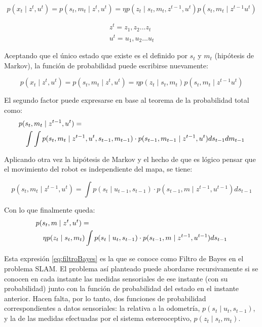 \begin{equation}\label{eq:prob_estado}
    p(x_{t}\mid z^{t},u^{t}) = p(s_{t},m_{t}\mid z^{t},u^{t})=\eta p(z_{t}\mid s_{t},m_{t},z^{t-1},u^{t})p(s_{t},m_{t}\mid z^{t-1}u^{t})
\end{equation}


\begin{eqnarray}
    z^{t} = z_{1},z_{2}...z_{t} \nonumber\\
    u^{t} = u_{1},u_{2}...u_{t}
\end{eqnarray}

Aceptando que el único estado que existe es el definido por $s_{t}$ y $m_{t}$ (hipótesis de Markov), la función de probabilidad puede escribirse nuevamente:

\begin{equation}\label{eq:prob_markov}
    p(x_{t}\mid z^{t},u^{t}) = p(s_{t},m_{t}\mid z^{t},u^{t}) = \eta p(z_{t}\mid s_{t},m_{t})p(s_{t},m_{t}\mid z^{t-1}u^{t})
\end{equation}

El segundo factor puede expresarse en base al teorema de la probabilidad total como:
\begin{eqnarray}\label{eq:prob_total}
  \lefteqn{p(s_{t},m_{t}\mid z^{t-1},u^{t}) =} \\
	&&  \int\int p(s_{t},m_{t}\mid z^{t-1},u^{t},s_{t-1},m_{t-1})
 	\cdot p(s_{t-1},m_{t-1}\mid z^{t-1},u^{t}) ds_{t-1}dm_{t-1}  \nonumber
\end{eqnarray}

Aplicando otra vez la hipótesis de Markov y el hecho de que es lógico pensar que el movimiento del robot es independiente del mapa, se tiene:

\begin{equation}\label{eq:termino2}
    p(s_{t},m_{t}\mid z^{t-1},u^{t}) = \int p(s_{t}\mid u_{t-1},s_{t-1})
    \cdot p(s_{t-1},m\mid z^{t-1},u^{t-1})ds_{t-1}
\end{equation}


Con lo que finalmente queda:
\begin{eqnarray}\label{eq:filtroBayes}
  \lefteqn{p(s_{t},m\mid z^{t},u^{t}) = } \\
  && \eta p(z_{t}\mid s_{t},m_{t})\int p(s_{t}\mid u_{t},s_{t-1})
  \cdot p(s_{t-1},m\mid z^{t-1},u^{t-1})ds_{t-1} \nonumber
\end{eqnarray}

Esta expresión \ref{eq:filtroBayes} es la que se conoce como Filtro de Bayes en el problema SLAM. El problema así planteado puede abordarse recursivamente si se conocen en cada instante las medidas sensoriales de ese instante (con su probabilidad) junto con la función de probabilidad del estado en el instante anterior.
Hacen falta, por lo tanto, dos funciones de probabilidad correspondientes a datos sensoriales: la relativa a la odometría, $p(s_{t}\mid u_{t},s_{t-1})$, y la de las medidas efectuadas por el sistema estereoceptivo, $p(z_{t}\mid s_{t},m_{t})$.

